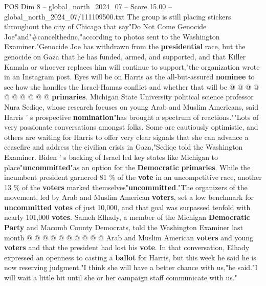 \begin{textsample}{POS Dim 8 – global\_north\_2024\_07 – Score 15.00 – global\_north\_2024\_07/111109500.txt}
The group is still placing stickers throughout the city of Chicago that say"Do Not Come Genocide Joe"and"\#cancelthednc,"according to photos sent to the Washington Examiner."Genocide Joe has withdrawn from the \textbf{presidential} race, but the genocide on Gaza that he has funded, armed, and supported, and that Killer Kamala or whoever replaces him will continue to support,"the organization wrote in an Instagram post.
Eyes will be on Harris as the all-but-assured \textbf{nominee} to see how she handles the Israel-Hamas conflict and whether that will be @ @ @ @ @ @ @ @ @ @ \textbf{primaries}.
Michigan State University political science professor Nura Sediqe, whose research focuses on young Arab and Muslim Americans, said Harris ' s prospective \textbf{nomination}"has brought a spectrum of reactions.""Lots of very passionate conversations amongst folks.
Some are cautiously optimistic, and others are waiting for Harris to offer very clear signals that she can advance a ceasefire and address the civilian crisis in Gaza,"Sediqe told the Washington Examiner.
Biden ' s backing of Israel led key states like Michigan to place"\textbf{uncommitted}"as an option for the \textbf{Democratic} \textbf{primaries}.
While the incumbent president garnered 81 \% of the \textbf{vote} in an uncompetitive race, another 13 \% of the \textbf{voters} marked themselves"\textbf{uncommitted}."The organizers of the movement, led by Arab and Muslim American \textbf{voters}, set a low benchmark for \textbf{uncommitted} \textbf{votes} of just 10,000, and that goal was surpassed tenfold with nearly 101,000 \textbf{votes}.
Sameh Elhady, a member of the Michigan \textbf{Democratic} \textbf{Party} and Macomb County Democrats, told the Washington Examiner last month @ @ @ @ @ @ @ @ @ @ Arab and Muslim American \textbf{voters} and young \textbf{voters} and that the president had lost his \textbf{vote}.
In that conversation, Elhady expressed an openness to casting a \textbf{ballot} for Harris, but this week he said he is now reserving judgment."I think she will have a better chance with us,"he said."I will wait a little bit until she or her campaign staff communicate with us."

\end{textsample}
